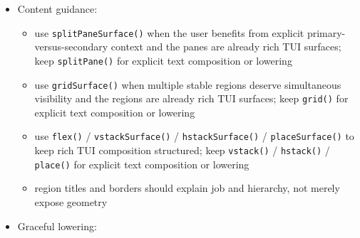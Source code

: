\begin{itemize}
  \begin{itemize}
  \tightlist
  \item
    TUI
  \end{itemize}
\item
  Content guidance:

  \begin{itemize}
  \tightlist
  \item
    use \texttt{s\allowbreak{}p\allowbreak{}l\allowbreak{}i\allowbreak{}t\allowbreak{}P\allowbreak{}a\allowbreak{}n\allowbreak{}e\allowbreak{}S\allowbreak{}u\allowbreak{}r\allowbreak{}f\allowbreak{}a\allowbreak{}c\allowbreak{}e\allowbreak{}(\allowbreak{})} when the user benefits from explicit primary-versus-secondary context and the panes are already rich TUI surfaces; keep \texttt{s\allowbreak{}p\allowbreak{}l\allowbreak{}i\allowbreak{}t\allowbreak{}P\allowbreak{}a\allowbreak{}n\allowbreak{}e\allowbreak{}(\allowbreak{})} for explicit text composition or lowering
  \item
    use \texttt{g\allowbreak{}r\allowbreak{}i\allowbreak{}d\allowbreak{}S\allowbreak{}u\allowbreak{}r\allowbreak{}f\allowbreak{}a\allowbreak{}c\allowbreak{}e\allowbreak{}(\allowbreak{})} when multiple stable regions deserve simultaneous visibility and the regions are already rich TUI surfaces; keep \texttt{g\allowbreak{}r\allowbreak{}i\allowbreak{}d\allowbreak{}(\allowbreak{})} for explicit text composition or lowering
  \item
    use \texttt{f\allowbreak{}l\allowbreak{}e\allowbreak{}x\allowbreak{}(\allowbreak{})} / \texttt{v\allowbreak{}s\allowbreak{}t\allowbreak{}a\allowbreak{}c\allowbreak{}k\allowbreak{}S\allowbreak{}u\allowbreak{}r\allowbreak{}f\allowbreak{}a\allowbreak{}c\allowbreak{}e\allowbreak{}(\allowbreak{})} / \texttt{h\allowbreak{}s\allowbreak{}t\allowbreak{}a\allowbreak{}c\allowbreak{}k\allowbreak{}S\allowbreak{}u\allowbreak{}r\allowbreak{}f\allowbreak{}a\allowbreak{}c\allowbreak{}e\allowbreak{}(\allowbreak{})} / \texttt{p\allowbreak{}l\allowbreak{}a\allowbreak{}c\allowbreak{}e\allowbreak{}S\allowbreak{}u\allowbreak{}r\allowbreak{}f\allowbreak{}a\allowbreak{}c\allowbreak{}e\allowbreak{}(\allowbreak{})} to keep rich TUI composition structured; keep \texttt{v\allowbreak{}s\allowbreak{}t\allowbreak{}a\allowbreak{}c\allowbreak{}k\allowbreak{}(\allowbreak{})} / \texttt{h\allowbreak{}s\allowbreak{}t\allowbreak{}a\allowbreak{}c\allowbreak{}k\allowbreak{}(\allowbreak{})} / \texttt{p\allowbreak{}l\allowbreak{}a\allowbreak{}c\allowbreak{}e\allowbreak{}(\allowbreak{})} for explicit text composition or lowering
  \item
    region titles and borders should explain job and hierarchy, not merely expose geometry
  \end{itemize}
\item
  Graceful lowering:


\end{itemize}
